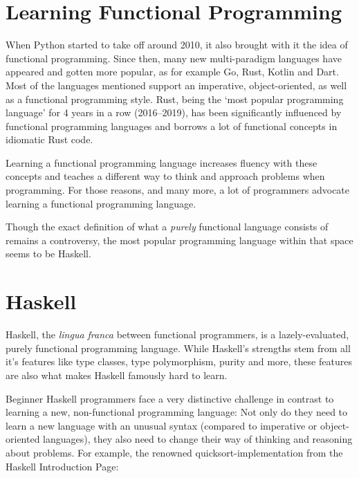 
\section{Learning Functional Programming}
When Python started to take off around 2010\autocite{python-popularity},
it also brought with it the idea of functional programming. Since then, many new multi-paradigm
languages have appeared and gotten more popular, as for example Go, Rust,
Kotlin and Dart.
Most of the languages mentioned support an imperative, object-oriented, as well as a functional programming style.
Rust, being the `most popular programming language'\autocite{rust-loved} for 4 years in a row (2016--2019), has been
significantly influenced by functional programming languages\autocite{rust-functional} and borrows a lot of functional
concepts in idiomatic Rust code.

Learning a functional programming language increases fluency with these concepts and teaches a different
way to think and approach problems when programming. For those reasons, and many more, a lot of programmers
advocate learning a functional programming language.

Though the exact definition of what a \textit{purely} functional language consists of remains a controversy\autocite{functional-controversy},
the most popular programming language within that space seems to be Haskell\autocite{comparison-functional-languages}.

\section{Haskell}

Haskell, the \textit{lingua franca} between functional programmers, is a lazely-evaluated, purely functional programming
language. While Haskell's strengths stem from all it's features like type classes, type polymorphism, purity and more,
these features are also what makes Haskell famously hard to learn\autocite{haskell-hard-one}\autocite{haskell-hard-two}\autocite{haskell-hard-three}\autocite{haskell-hard-four}.

Beginner Haskell programmers face a very distinctive challenge in contrast to learning a new, non-functional programming language:
Not only do they need to learn a new language with an unusual syntax (compared to imperative or object-oriented languages), they
also need to change their way of thinking and reasoning about problems.
For example, the renowned quicksort-implementation from the Haskell Introduction Page\autocite{haskell-quicksort}:

